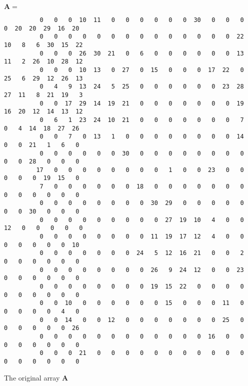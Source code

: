 \begin{listado}
$\mathbf{A} = $
\tiny
\begin{verbatim}
          0   0   0  10  11   0   0   0   0   0   0  30   0   0   0   0  20  20  29  16  20
          0   0   0   0   0   0   0   0   0   0   0   0   0   0  22  10   8   6  30  15  22
          0   0   0  26  30  21   0   6   0   0   0   0   0   0  13  11   2  26  10  28  12
          0   0   0  10  13   0  27   0  15   0   0   0  17  22   0  25   6  29  12  26  13
          0   4   9  13  24   5  25   0   0   0   0   0   0  23  28  27  11   8  21  19   3
          0   0  17  29  14  19  21   0   0   0   0   0   0   0  19  16  20  12  14  13  12
          0   6   1  23  24  10  21   0   0   0   0   0   0   0   7   0   4  14  18  27  26
          0   0   7   0  13   1   0   0   0   0   0   0   0   0  14   0   0  21   1   6   0
          0   0   0   0   0   0  30   0   0   0   0   0   0   0   0   0   0  28   0   0   0
         17   0   0   0   0   0   0   0   0   1   0   0  23   0   0   0   0   0  19  15   0
          7   0   0   0   0   0   0  18   0   0   0   0   0   0   0   0   0   0   0   0   0
          0   0   0   0   0   0   0   0  30  29   0   0   0   0   0   0   0  30   0   0   0
          0   0   0   0   0   0   0   0   0  27  19  10   4   0   0  12   0   0   0   0   0
          0   0   0   0   0   0   0   0  11  19  17  12   4   0   0   0   0   0   0   0  10
          0   0   0   0   0   0   0  24   5  12  16  21   0   0   2   0   0   0   0   0   0
          0   0   0   0   0   0   0   0  26   9  24  12   0   0  23   0   0   0   0   0   0
          0   0   0   0   0   0   0   0  19  15  22   0   0   0   0   0   0   0   0   0   0
          0   0  10   0   0   0   0   0   0  15   0   0   0  11   0   0   0   0   0   4   0
          0   0  14   0   0  12   0   0   0   0   0   0   0  25   0   0   0   0   0   0  26
          0   0   0   0   0   0   0   0   0   0   0   0  16   0   0   0   0   0   0   0   0
          0   0   0  21   0   0   0   0   0   0   0   0   0   0   0   0   0   0   0   0   0            
\end{verbatim}                                                                                 
\caption{The original array $\mathbf{A}$}                                                      
\label{lis:arraya}                                                                             
\end{listado}                                                                                  
                                                                                               
